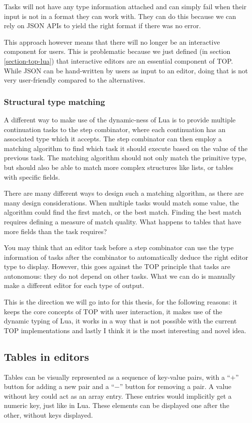 Tasks will not have any type information attached and can simply fail when their input is not in a format they can work with. They can do this because we can rely on JSON APIs to yield the right format if there was no error.

This approach however means that there will no longer be an interactive component for users. This is problematic because we just defined (in section \ref{section-top-lua}) that interactive editors are an essential component of TOP. While JSON can be hand-written by users as input to an editor, doing that is not very user-friendly compared to the alternatives.

\subsubsection{Structural type matching}
A different way to make use of the dynamic-ness of Lua is to provide multiple continuation tasks to the step combinator, where each continuation has an associated type which it accepts. The step combinator can then employ a matching algorithm to find which task it should execute based on the value of the previous task.
The matching algorithm should not only match the primitive type, but should also be able to match more complex structures like lists, or tables with specific fields.

There are many different ways to design such a matching algorithm, as there are many design considerations. When multiple tasks would match some value, the algorithm could find the first match, or the best match. Finding the best match requires defining a measure of match quality. What happens to tables that have more fields than the task requires?

You may think that an editor task before a step combinator can use the type information of tasks after the combinator to automatically deduce the right editor type to display. However, this goes against the TOP principle that tasks are autonomous: they do not depend on other tasks. What we can do is manually make a different editor for each type of output.

This is the direction we will go into for this thesis, for the following reasons:
it keeps the core concepts of TOP with user interaction,
it makes use of the dynamic typing of Lua,
it works in a way that is not possible with the current TOP implementations
and lastly I think it is the most interesting and novel idea.

\subsection{Tables in editors}
Tables can be visually represented as a sequence of key-value pairs, with a ``$+$'' button for adding a new pair and a ``$-$'' button for removing a pair. A value without key could act as an array entry. These entries would implicitly get a numeric key, just like in Lua. These elements can be displayed one after the other, without keys displayed.
